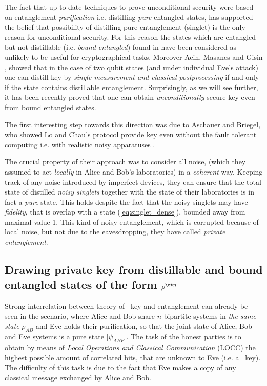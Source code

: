 \documentclass[rmp,12pt,preprint]{revtex4-2}
\begin{document}
The fact that up to date techniques to prove unconditional security
were based on entanglement {\it purification} i.e.  distilling {\it
pure} entangled states, has supported the belief that possibility of
distilling pure entanglement (singlet) is the only reason for unconditional
security.  For this reason the states which are entangled but not
distillable (i.e. {\it bound entangled}) found in \cite{bound} have
been considered as unlikely to be useful for cryptographical tasks. Moreover
Acin, Masanes and Gisin \cite{ALG_2_equiv}, showed that in the case of
two qubit states (and under individual Eve's attack) one can distill
key by {\it single measurement and classical postprocessing} if and
only if the state contains distillable entanglement. Surprisingly, as
we will see further, it has been recently proved that one can obtain
{\it unconditionally} secure key even from bound entangled states.

The first interesting step towards this direction was due to Aschauer and Briegel,
who showed Lo and Chau's protocol provide key even without the fault tolerant
computing i.e. with realistic noisy apparatuses \cite{AschauerBriegel2002}.

 The crucial property of their approach was
to consider all noise, (which they assumed to act {\it locally} in
Alice and Bob's laboratories) in a {\it coherent} way. Keeping track
of any noise introduced by imperfect devices, they can ensure that the
total state of distilled {\it noisy singlets} together with the state
of their laboratories is in fact a {\it pure} state. This holds
despite the fact that the noisy singlets may have {\it fidelity}, that
is overlap with a state (\ref{eq:singlet_dense}), bounded away from
maximal value 1. This kind of noisy entanglement, which is corrupted
because of local noise, but not due to the eavesdropping, they have
called {\it private entanglement}.





\subsection{Drawing private key from distillable and bound entangled
states of the form $\rho^{\ot n}$ }
\label{subsec:QKA}

Strong interrelation between theory of \secure\ key and entanglement
can already be seen in the scenario, where Alice and Bob share $n$
bipartite systems in {\it the same state} $\rho_{AB}$ and Eve holds
their purification, so that the joint state of Alice, Bob and Eve
systems is a pure state $|\psi_{ABE}\>$. The task of the honest
parties is to obtain by means of {\it Local Operations and Classical
  Communication} (LOCC) the highest possible amount of correlated
bits, that are unknown to Eve (i.e. a \secure\ key). The difficulty of
this task is due to the fact that Eve makes a copy of any classical
message exchanged by Alice and Bob.
\end{document}
